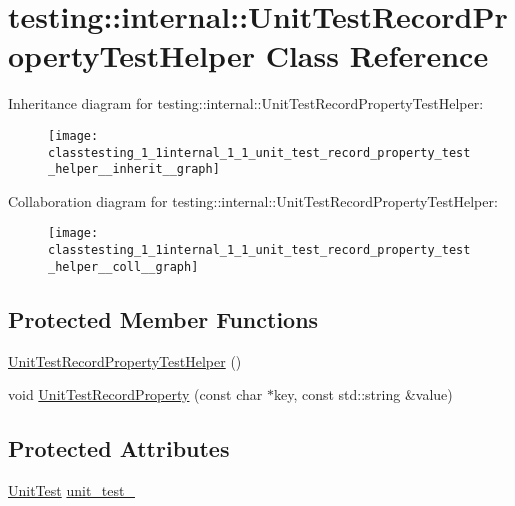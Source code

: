 \hypertarget{classtesting_1_1internal_1_1_unit_test_record_property_test_helper}{}\section{testing\+:\+:internal\+:\+:Unit\+Test\+Record\+Property\+Test\+Helper Class Reference}
\label{classtesting_1_1internal_1_1_unit_test_record_property_test_helper}


Inheritance diagram for testing\+:\+:internal\+:\+:Unit\+Test\+Record\+Property\+Test\+Helper\+:
\nopagebreak
\begin{figure}[H]
\begin{center}
\leavevmode
\texttt{[image: classtesting\_1\_1internal\_1\_1\_unit\_test\_record\_property\_test\_helper\_\_inherit\_\_graph]}
\end{center}
\end{figure}


Collaboration diagram for testing\+:\+:internal\+:\+:Unit\+Test\+Record\+Property\+Test\+Helper\+:
\nopagebreak
\begin{figure}[H]
\begin{center}
\leavevmode
\texttt{[image: classtesting\_1\_1internal\_1\_1\_unit\_test\_record\_property\_test\_helper\_\_coll\_\_graph]}
\end{center}
\end{figure}
\subsection*{Protected Member Functions}
\begin{DoxyCompactItemize}
\item 
\hyperlink{classtesting_1_1internal_1_1_unit_test_record_property_test_helper_aa2bdfe52eb2aab5233ce9118917a4750}{Unit\+Test\+Record\+Property\+Test\+Helper} ()
\item 
void \hyperlink{classtesting_1_1internal_1_1_unit_test_record_property_test_helper_a9c5432d080faf13a1db6baff0a2944f4}{Unit\+Test\+Record\+Property} (const char $\ast$key, const std\+::string \&value)
\end{DoxyCompactItemize}
\subsection*{Protected Attributes}
\begin{DoxyCompactItemize}
\item 
\hyperlink{classtesting_1_1_unit_test}{Unit\+Test} \hyperlink{classtesting_1_1internal_1_1_unit_test_record_property_test_helper_a415e13a354d3b8bd97db96aae5ef5df1}{unit\+\_\+test\+\_\+}
\end{DoxyCompactItemize}
